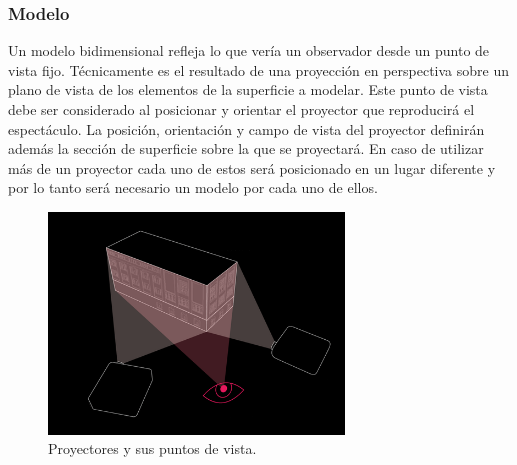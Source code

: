 \subsubsection{Modelo}
Un modelo bidimensional refleja lo que vería un observador desde un punto de vista fijo.
Técnicamente es el resultado de una proyección en perspectiva \cite{LibroCompGrafica} sobre un plano de vista de los elementos de la superficie a modelar.
Este punto de vista debe ser considerado al posicionar y orientar el proyector que reproducirá el espectáculo.
La posición, orientación y campo de vista del proyector definirán además la sección de superficie sobre la que se proyectará.
En caso de utilizar más de un proyector cada uno de estos será posicionado en un lugar diferente y por lo tanto será necesario un modelo por cada uno de ellos.

\begin{figure}[H]
  \centering
    \includegraphics[width=0.7\textwidth]{./Cap2_videomapping/diagrama-2proyectores}
  \caption{Proyectores y sus puntos de vista.}%
  \label{fig:diagrama-2proyectores}
\end{figure}

